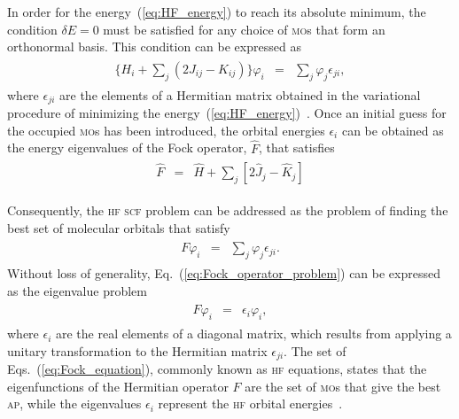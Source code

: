 In order for the energy~(\ref{eq:HF_energy}) to reach its absolute
minimum, the condition $\delta E = 0$ must be satisfied for any choice
of \textsc{mo}s that form an orthonormal basis. This condition can be
expressed as~\cite{Roothaan_HF,Levine_QChem}
%
\begin{eqnarray}
  \begin{split}
    \{H_{i} + \sum\limits_{j} ( 2J_{ij} - K_{ij} ) \} \varphi_{i} & = &
    \sum\limits_{j} \varphi_{j} \epsilon_{ji},
  \end{split}
\label{eq:deltaEzero}
\end{eqnarray}
%
where $\epsilon_{ji}$ are the elements of a Hermitian matrix obtained
in the variational procedure of minimizing the
energy~(\ref{eq:HF_energy})~\cite{Roothaan_HF}. Once an initial guess
for the occupied \textsc{mo}s has been introduced, the orbital
energies $\epsilon_{i}$ can be obtained as the energy eigenvalues of
the Fock operator, $\hat{F}$, that satisfies
%
\begin{eqnarray}
  \begin{split}
    \hat{F} & = & \hat{H} +
    \sum\limits_{j} [ 2\hat{J}_{j} - \hat{K}_{j} ]
  \end{split}
  \label{eq:F_operator}
\end{eqnarray}
%

Consequently, the \textsc{hf} \textsc{scf} problem can be addressed as
the problem of finding the best set of molecular orbitals that
satisfy~\cite{Roothaan_HF,Levine_QChem}
%
\begin{eqnarray}
  \begin{split}
    F \varphi_{i} & = & \sum\limits_{j} \varphi_{j} \epsilon_{ji}.
  \end{split}
  \label{eq:Fock_operator_problem}
\end{eqnarray}
%
Without loss of generality, Eq.~(\ref{eq:Fock_operator_problem}) can
be expressed as the eigenvalue problem
%
\begin{eqnarray}
  \begin{split}
    F \varphi_{i} & = & \epsilon_{i} \varphi_{i},
  \end{split}
  \label{eq:Fock_equation}
\end{eqnarray}
%
where $\epsilon_{i}$ are the real elements of a diagonal matrix, which
results from applying a unitary transformation to the Hermitian matrix
$\epsilon_{ji}$. The set of Eqs.~(\ref{eq:Fock_equation}), commonly
known as \textsc{hf} equations, states that the eigenfunctions of the
Hermitian operator $F$ are the set of \textsc{mo}s that give the best
\textsc{ap}, while the eigenvalues $\epsilon_{i}$ represent the
\textsc{hf} orbital energies~\cite{Roothaan_HF}.

